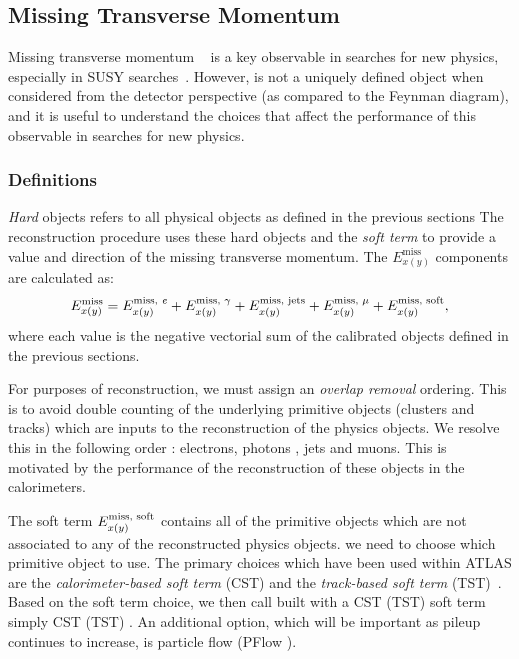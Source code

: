 \subsection{Missing Transverse Momentum}

Missing transverse momentum \met ~\cite{Aad:2016nrq} is a key observable in searches for new physics, especially in SUSY searches~\cite{ATL-PHYS-PUB-2010-010,ATL-PHYS-PUB-2015-005}.
However, \met is not a uniquely defined object when considered from the detector perspective (as compared to the Feynman diagram), and it is useful to understand the choices that affect the performance of this observable in searches for new physics.

\subsubsection{\met Definitions}

\textit{Hard} objects refers to all physical objects as defined in the previous sections
The \met reconstruction procedure uses these hard objects and the \textit{soft term} to provide a value and direction of the missing transverse momentum.
The $E^{\text{miss}}_{x(y)}$ components are calculated as:
\begin{equation}
  \Emiss{x(y)} = \Emisscomp{x(y)}{\text{\textit{e}}}
               + \Emisscomp{x(y)}{\gamma}
               + \Emisscomp{x(y)}{\text{jets}}
               + \Emisscomp{x(y)}{\mu}
               + \Emisscomp{x(y)}{\text{soft}},
  \label{eq:met-sum}
\end{equation}
where each value  is the negative vectorial sum of the calibrated objects defined in the previous sections.

For purposes of \met reconstruction, we must assign an \textit{overlap removal} ordering.
This is to avoid double counting of the underlying primitive objects (clusters and tracks) which are inputs to the reconstruction of the physics objects.
We resolve this in the following order : electrons, photons , jets and muons.
This is motivated by the performance of the reconstruction of these objects in the calorimeters.

The soft term $\Emisscomp{x(y)}{\text{soft}}$ contains all of the primitive objects which are not associated to any of the reconstructed physics objects.
we need to choose which primitive object to use.
The primary choices which have been used within ATLAS are the \textit{ calorimeter-based soft term} (CST) and the \textit{track-based soft term} (TST)~\cite{Aad:2016nrq}.
Based on the soft term choice, we then call \met built with a CST (TST) soft term simply CST (TST) \met.
An additional option, which will be important as pileup continues to increase, is particle flow \met (PFlow \met).

